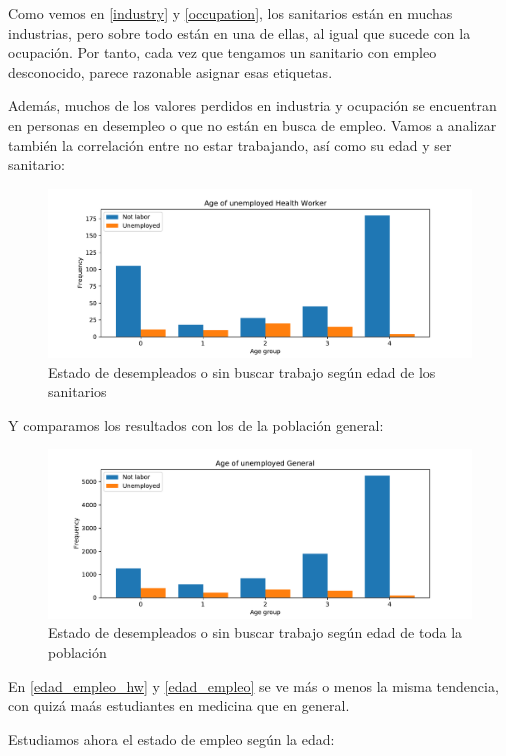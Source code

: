 \documentclass[twoside,openright,titlepage,numbers=noenddot,openany,headinclude,footinclude=true,
cleardoublepage=empty,abstractoff,BCOR=5mm,paper=a4,fontsize=12pt,main=spanish]{scrreprt}
\begin{document}
Como vemos en \eqref{industry} y \eqref{occupation}, los sanitarios están en muchas industrias, pero sobre todo están en una de ellas, al igual que sucede con la ocupación. Por tanto, cada vez que tengamos un sanitario con empleo desconocido, parece razonable asignar esas etiquetas.

Además, muchos de los valores perdidos en industria y ocupación se encuentran en personas en desempleo o que no están en busca de empleo. Vamos a analizar también la correlación entre no estar trabajando, así como su edad y ser sanitario:

\begin{figure}[H]
\includegraphics[scale=0.5]{edad_hw.pdf}
\caption{Estado de desempleados o sin buscar trabajo según edad de los sanitarios}
\label{edad_empleo_hw}
\end{figure}

Y comparamos los resultados con los de la población general:

\begin{figure}[H]
\includegraphics[scale=0.5]{unemployed_edad.pdf}
\caption{Estado de desempleados o sin buscar trabajo según edad de toda la población}
\label{edad_empleo}
\end{figure}

En \eqref{edad_empleo_hw} y \eqref{edad_empleo} se ve más o menos la misma tendencia, con quizá maás estudiantes en medicina que en general.

Estudiamos ahora el estado de empleo según la edad:
\end{document}
